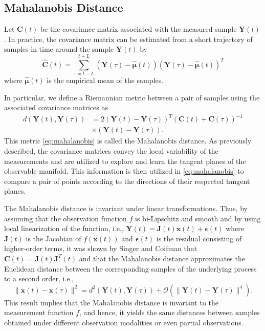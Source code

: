 \documentclass[aip,jcp,reprint,twocolumn]{revtex4-1}
\begin{document}
\subsection{Mahalanobis Distance}
\label{subsec:mahalanobis}

Let $\mathbf{C}(t)$ be the covariance matrix associated with the measured sample $\mathbf{Y}(t)$. In practice, the covariance matrix can be estimated from a short trajectory of samples in time around the sample $\mathbf{Y}(t)$ by
\begin{equation}
	\widehat{\mathbf{C}}(t) = \sum \limits _{\tau = t-L}^{t+L} (\mathbf{Y}(\tau) - \widehat{\boldsymbol{\mu}}(t))(\mathbf{Y}(\tau) - \widehat{\boldsymbol{\mu}}(t))^T
	\label{eq:cov}
\end{equation}
where $\widehat{\boldsymbol{\mu}}(t)$ is the empirical mean of the samples.

In particular, we define a Riemannian metric between a pair of samples using the associated covariance matrices as
\begin{align}
	d(\mathbf{Y}(t), \mathbf{Y}(\tau)) &= 2 (\mathbf{Y}(t) - \mathbf{Y}(\tau))^T(\mathbf{C}(t) + \mathbf{C}(\tau))^{-1} \nonumber \\
	&\times (\mathbf{Y}(t) - \mathbf{Y}(\tau)).
	\label{eq:mahalanobis}
\end{align}
This metric \eqref{eq:mahalanobis} is called the Mahalanobis distance.
%
As previously described, the covariance matrices convey the local variability of the measurements and are utilized to explore and learn the tangent planes of the observable manifold.
%
This information is then utilized in \eqref{eq:mahalanobis} to compare a pair of points according to the directions of their respected tangent planes.

The Mahalanobis distance is invariant under linear transformations.
%
Thus, by assuming that the observation function $f$ is bi-Lipschitz and smooth and by using local linearization of the function, i.e., $\mathbf{Y}(t) = \mathbf{J}(t) \mathbf{x}(t) + \boldsymbol{\epsilon}(t)$ where $\mathbf{J}(t)$ is the Jacobian of $f(\mathbf{x}(t))$ and $\boldsymbol{\epsilon}(t)$ is the residual consisting of higher-order terms, it was shown by Singer and Coifman \cite{singer2008non} that $\mathbf{C}(t) = \mathbf{J}(t)\mathbf{J}^T(t)$ and that the Mahalanobis distance approximates the Euclidean distance between the corresponding samples of the underlying process to a second order, i.e.,
\begin{equation}
	\| \mathbf{x}(t) - \mathbf{x}(\tau) \|^2 = d^2(\mathbf{Y}(t), \mathbf{Y}(\tau)) + \mathcal{O}(\| \mathbf{Y}(t) - \mathbf{Y}(\tau)\|^4).
\end{equation}
%
This result implies that the Mahalanobis distance is invariant to the measurement function $f$, and hence, 
it yields the same distances between samples obtained under different observation modalities or even partial observations.
\end{document}
